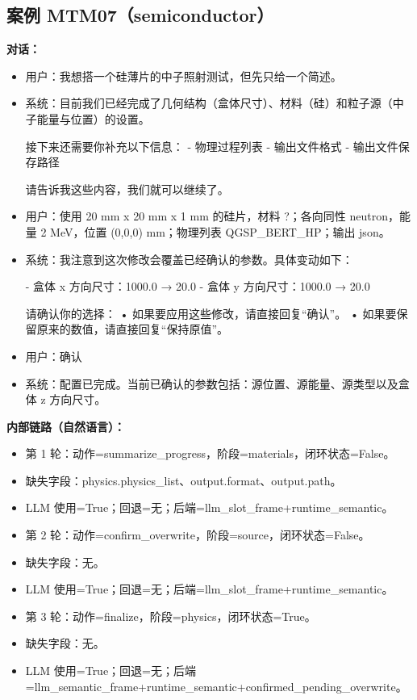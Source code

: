 \documentclass[11pt]{ctexart}
\begin{document}
\subsection{案例 MTM07（semiconductor）}
\textbf{对话：}
\begin{itemize}
\item 用户：我想搭一个硅薄片的中子照射测试，但先只给一个简述。
\item 系统：目前我们已经完成了几何结构（盒体尺寸）、材料（硅）和粒子源（中子能量与位置）的设置。

接下来还需要你补充以下信息：
- 物理过程列表
- 输出文件格式
- 输出文件保存路径

请告诉我这些内容，我们就可以继续了。
\item 用户：使用 20 mm x 20 mm x 1 mm 的硅片，材料 ?；各向同性 neutron，能量 2 MeV，位置 (0,0,0) mm；物理列表 QGSP\_BERT\_HP；输出 json。
\item 系统：我注意到这次修改会覆盖已经确认的参数。具体变动如下：

- 盒体 x 方向尺寸：1000.0 → 20.0
- 盒体 y 方向尺寸：1000.0 → 20.0

请确认你的选择：
• 如果要应用这些修改，请直接回复“确认”。
• 如果要保留原来的数值，请直接回复“保持原值”。
\item 用户：确认
\item 系统：配置已完成。当前已确认的参数包括：源位置、源能量、源类型以及盒体 z 方向尺寸。
\end{itemize}
\textbf{内部链路（自然语言）：}
\begin{itemize}
\item 第 1 轮：动作=summarize\_progress，阶段=materials，闭环状态=False。
\item 缺失字段：physics.physics\_list、output.format、output.path。
\item LLM 使用=True；回退=无；后端=llm\_slot\_frame+runtime\_semantic。
\item 第 2 轮：动作=confirm\_overwrite，阶段=source，闭环状态=False。
\item 缺失字段：无。
\item LLM 使用=True；回退=无；后端=llm\_slot\_frame+runtime\_semantic。
\item 第 3 轮：动作=finalize，阶段=physics，闭环状态=True。
\item 缺失字段：无。
\item LLM 使用=True；回退=无；后端=llm\_semantic\_frame+runtime\_semantic+confirmed\_pending\_overwrite。
\end{itemize}
\end{document}

